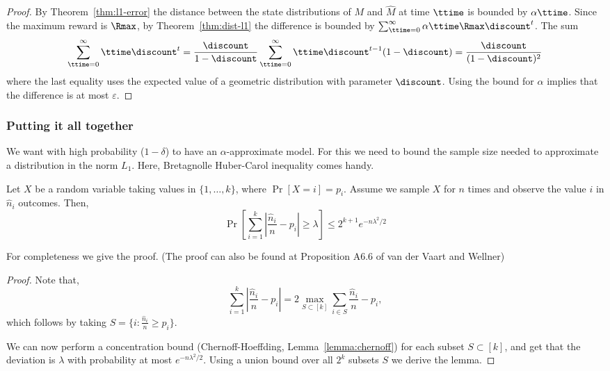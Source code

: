 \begin{proof}
By Theorem~\ref{thm:l1-error} the distance between the state distributions of $M$ and $\widehat{M}$ at time $\ttime$ is bounded by $\alpha\ttime$. Since the maximum reward  is $\Rmax$, by Theorem~\ref{thm:dist-l1} the difference is bounded by
$\sum_{\ttime=0}^\infty \alpha\ttime \Rmax\discount^t$.
The sum 
$$\sum_{\ttime=0}^\infty \ttime \discount^t=\frac{\discount}{1-\discount}\sum_{\ttime=0}^\infty \ttime \discount^{t-1}(1-\discount)=\frac{\discount}{(1-\discount)^2}$$
where the last equality uses the expected value of a geometric distribution with parameter $\discount$.
%
Using the bound for $\alpha$ implies that the difference is at most $\varepsilon$.
%
\end{proof}

\subsubsection{Putting it all together}

We want with high probability ($1-\delta$) to have an
$\alpha$-approximate model. For this we need to bound the sample
size needed to approximate a distribution in the norm $L_1$. Here,
Bretagnolle Huber-Carol inequality comes handy.

\begin{lemma}
Let $X$ be a random variable taking values in $\{1, \ldots , k\}$,
where $\Pr[X=i]=p_i$. Assume we sample $X$ for $n$ times and
observe the value $i$ in $\hat{n}_i$ outcomes. Then,
\[
\Pr[\sum_{i=1}^k \left|\frac{\hat{n}_i}{n}-p_i\right|\geq
\lambda]\leq 2^{k+1} e^{-n\lambda^2/2}
\]
\end{lemma}

For completeness we give the proof. (The proof can also be found at
Proposition A6.6 of van der Vaart and Wellner)
\begin{proof}
Note that,
\[
\sum_{i=1}^k |\frac{\hat{n}_i}{n}-p_i| = 2\max_{S\subset [k]}
\sum_{i\in S} \frac{\hat{n}_i}{n}-p_i,
\]
which follows by taking $S=\{i:\frac{\hat{n}_i}{n}\geq p_i\}$.

We can now perform a concentration bound (Chernoff-Hoeffding, Lemma~\ref{lemma:chernoff}) for
each subset $S\subset [k]$, and get that the deviation is $\lambda$
with probability at most $e^{-n\lambda^2/2}$. Using a union bound
over all $2^k$ subsets $S$ we
 derive the lemma.
\end{proof}

